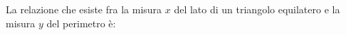 La relazione che esiste fra la misura $x$ del lato di un
triangolo equilatero e la misura $y$ del perimetro è:
